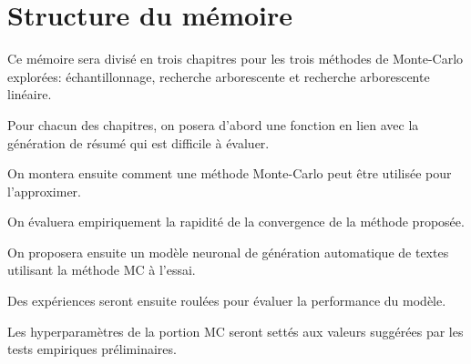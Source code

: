 \section*{Structure du mémoire}

Ce mémoire sera divisé en trois chapitres pour les trois méthodes de Monte-Carlo explorées:
échantillonnage, recherche arborescente et recherche arborescente linéaire.

Pour chacun des chapitres, on posera d'abord une fonction en lien avec la génération de résumé
qui est difficile à évaluer.

On montera ensuite comment une méthode Monte-Carlo
peut être utilisée pour l'approximer.

On évaluera empiriquement la rapidité
de la convergence de la méthode proposée.

On proposera ensuite un modèle neuronal
de génération automatique de textes utilisant la méthode MC à l'essai.

Des expériences seront ensuite roulées pour évaluer la performance du modèle.

Les hyperparamètres de la portion MC seront settés aux valeurs suggérées par les tests
empiriques préliminaires.